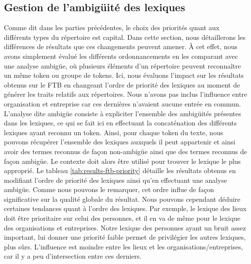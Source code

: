 \documentclass[12pt,a4paper,times,twoside,openright]{report}
\begin{document}
        \subsection{Gestion de l'ambigüité des lexiques}
        \label{subsec:taxonomy-ftb-priorities}
Comme dit dans les parties précédentes, le choix des priorités quant aux différents types du répertoire est capital. Dans cette section, nous détaillerons les différences de résultats que ces changements peuvent amener. À cet effet, nous avons simplement évalué les différents ordonnancements en les comparant avec une analyse ambigüe, où plusieurs éléments d'un répertoire peuvent reconnaître un même token ou groupe de tokens. Ici, nous évaluons l'impact sur les résultats obtenus sur le FTB en changeant l'ordre de priorité des lexiques au moment de générer les traits relatifs aux répertoires. Nous n'avons pas inclus l'influence entre organisation et entreprise car ces dernières n'avaient aucune entrée en commun. L'analyse dite ambigüe consiste à expliciter l'ensemble des ambigüités présentes dans les lexiques, ce qui se fait ici en effectuant la concaténation des différents lexiques ayant reconnu un token. Ainsi, pour chaque token du texte, nous pouvons récupérer l'ensemble des lexiques auxquels il peut appartenir et ainsi avoir des termes reconnus de façon non-ambigüe ainsi que des termes reconnus de façon ambigüe. Le contexte doit alors être utilisé pour trouver le lexique le plus approprié. Le tableau \ref{tab:results-ftb-priority} détaille les résultats obtenus en modifiant l'ordre de priorité des lexiques ainsi qu'en effectuant une analyse ambigüe. Comme nous pouvons le remarquer, cet ordre influe de façon significative sur la qualité globale du résultat. Nous pouvons cependant déduire certaines tendances quant à l'ordre des lexiques. Par exemple, le lexique des lieux doit être prioritaire sur celui des personnes, et il en va de même pour le lexique des organisations et entreprises. Notre lexique des personnes ayant un bruit assez important, lui donner une priorité faible permet de privilégier les autres lexiques, plus sûrs. L'influence est moindre entre les lieux et les organisations/entreprises, car il y a peu d'intersection entre ces derniers.
\end{document}
